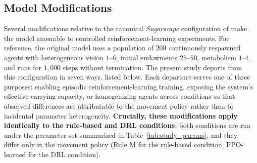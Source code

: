 \documentclass[pdflatex,sn-mathphys-num]{sn-jnl}%
\theoremstyle{thmstyleone}%
\theoremstyle{thmstyletwo}%
\theoremstyle{thmstylethree}%
\begin{document}
\subsection{Model Modifications}

Several modifications relative to the canonical \textit{Sugarscape} configuration of \citet{EpsteinAxtell1996} make the model amenable to controlled reinforcement-learning experiments.  
For reference, the original model uses a population of $200$ continuously respawned agents with heterogeneous vision $1$--$6$, initial endowments $25$--$50$, metabolism $1$--$4$, and runs for $1{,}000$ steps without termination.  
The present study departs from this configuration in seven ways, listed below.  
Each departure serves one of three purposes: enabling episodic reinforcement-learning training, exposing the system's effective carrying capacity, or homogenizing agents across conditions so that observed differences are attributable to the movement policy rather than to incidental parameter heterogeneity.  
\textbf{Crucially, these modifications apply identically to the rule-based and DRL conditions}; both conditions are run under the parameter set summarized in Table~\ref{tab:study_params}, and they differ only in the movement policy (Rule M for the rule-based condition, PPO-learned for the DRL condition).
\end{document}
